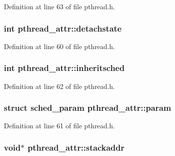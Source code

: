 Definition at line 63 of file pthread.\+h.

\hypertarget{structpthread__attr_a2ac0f3f9d4513024bbafc7db17c25a46}{
\subsubsection[{detachstate}]{\setlength{\rightskip}{0pt plus 5cm}int pthread\+\_\+attr\+::detachstate}}\label{structpthread__attr_a2ac0f3f9d4513024bbafc7db17c25a46}


Definition at line 60 of file pthread.\+h.

\hypertarget{structpthread__attr_ab6bef83bc858c0ffb3c8d0b461ba4396}{
\subsubsection[{inheritsched}]{\setlength{\rightskip}{0pt plus 5cm}int pthread\+\_\+attr\+::inheritsched}}\label{structpthread__attr_ab6bef83bc858c0ffb3c8d0b461ba4396}


Definition at line 62 of file pthread.\+h.

\hypertarget{structpthread__attr_a371c70c9e51a2444860395f7045bbd3e}{
\subsubsection[{param}]{\setlength{\rightskip}{0pt plus 5cm}struct sched\+\_\+param pthread\+\_\+attr\+::param}}\label{structpthread__attr_a371c70c9e51a2444860395f7045bbd3e}


Definition at line 61 of file pthread.\+h.

\hypertarget{structpthread__attr_a004b9c2b7c75177f4de0262277f48333}{
\subsubsection[{stackaddr}]{\setlength{\rightskip}{0pt plus 5cm}void$\ast$ pthread\+\_\+attr\+::stackaddr}}\label{structpthread__attr_a004b9c2b7c75177f4de0262277f48333}


